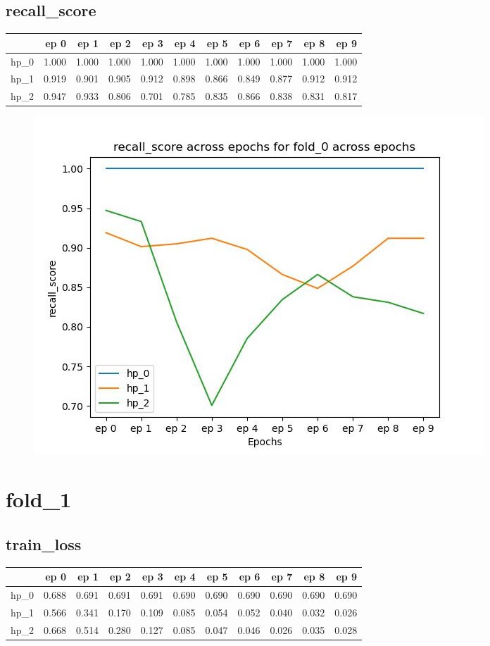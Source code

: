 \documentclass{article}
\begin{document}
\subsection{recall\_score}
\begin{tabular}{lrrrrrrrrrr}
\toprule
{} &   ep 0 &   ep 1 &   ep 2 &   ep 3 &   ep 4 &   ep 5 &   ep 6 &   ep 7 &   ep 8 &   ep 9 \\
\midrule
hp\_0 &  1.000 &  1.000 &  1.000 &  1.000 &  1.000 &  1.000 &  1.000 &  1.000 &  1.000 &  1.000 \\
hp\_1 &  0.919 &  0.901 &  0.905 &  0.912 &  0.898 &  0.866 &  0.849 &  0.877 &  0.912 &  0.912 \\
hp\_2 &  0.947 &  0.933 &  0.806 &  0.701 &  0.785 &  0.835 &  0.866 &  0.838 &  0.831 &  0.817 \\
\bottomrule
\end{tabular}

\begin{figure}[H]
\includegraphics[scale = 0.75]{fold_0/recall_score}
\end{figure}
\section{fold\_1}
\subsection{train\_loss}
\begin{tabular}{lrrrrrrrrrr}
\toprule
{} &   ep 0 &   ep 1 &   ep 2 &   ep 3 &   ep 4 &   ep 5 &   ep 6 &   ep 7 &   ep 8 &   ep 9 \\
\midrule
hp\_0 &  0.688 &  0.691 &  0.691 &  0.691 &  0.690 &  0.690 &  0.690 &  0.690 &  0.690 &  0.690 \\
hp\_1 &  0.566 &  0.341 &  0.170 &  0.109 &  0.085 &  0.054 &  0.052 &  0.040 &  0.032 &  0.026 \\
hp\_2 &  0.668 &  0.514 &  0.280 &  0.127 &  0.085 &  0.047 &  0.046 &  0.026 &  0.035 &  0.028 \\
\bottomrule
\end{tabular}
\end{document}
